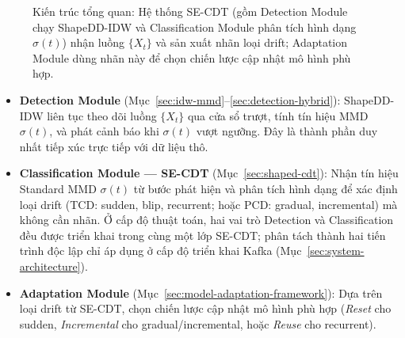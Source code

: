 \begin{figure}[H]
{}
	\caption{Kiến trúc tổng quan: Hệ thống SE-CDT (gồm Detection Module chạy ShapeDD-IDW và Classification Module phân tích hình dạng $\sigma(t)$) nhận luồng $\{X_t\}$ và sản xuất nhãn loại drift; Adaptation Module dùng nhãn này để chọn chiến lược cập nhật mô hình phù hợp.}
	\label{fig:system-modules-overview}
\end{figure}

\begin{itemize}
	\item \textbf{Detection Module} (Mục~\ref{sec:idw-mmd}--\ref{sec:detection-hybrid}):
	      ShapeDD-IDW liên tục theo dõi luồng $\{X_t\}$ qua cửa sổ trượt, tính tín hiệu MMD $\sigma(t)$, và phát cảnh báo khi $\sigma(t)$ vượt ngưỡng.
	      Đây là thành phần duy nhất tiếp xúc trực tiếp với dữ liệu thô.

	\item \textbf{Classification Module --- SE-CDT} (Mục~\ref{sec:shaped-cdt}):
	      Nhận tín hiệu Standard MMD $\sigma(t)$ từ bước phát hiện và phân tích hình dạng để xác định loại drift
	      (TCD: sudden, blip, recurrent; hoặc PCD: gradual, incremental) mà không cần nhãn.
	      Ở cấp độ thuật toán, hai vai trò Detection và Classification đều được triển khai trong cùng một lớp SE-CDT; phân tách thành hai tiến trình độc lập chỉ áp dụng ở cấp độ triển khai Kafka (Mục~\ref{sec:system-architecture}).

	\item \textbf{Adaptation Module} (Mục~\ref{sec:model-adaptation-framework}):
	      Dựa trên loại drift từ SE-CDT, chọn chiến lược cập nhật mô hình phù hợp
	      (\textit{Reset} cho sudden, \textit{Incremental} cho gradual/incremental, hoặc \textit{Reuse} cho recurrent).
\end{itemize}

